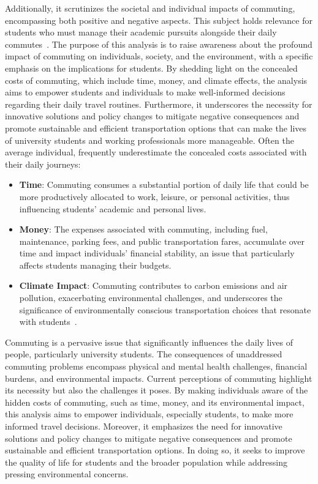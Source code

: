 Additionally, it scrutinizes the societal and individual impacts of commuting, encompassing both positive and negative
aspects.
This subject holds relevance for students who must manage their academic pursuits alongside their daily commutes~\cite{alma9921355859805762}.
The purpose of this analysis is to raise awareness about the profound impact of commuting on individuals, society, and
the environment, with a specific emphasis on the implications for students.
By shedding light on the concealed costs of commuting, which include time, money, and climate effects, the analysis aims
to empower students and individuals to make well-informed decisions regarding their daily travel routines.
Furthermore, it underscores the necessity for innovative solutions and policy changes to mitigate negative consequences
and promote sustainable and efficient transportation options that can make the lives of university students and working
professionals more manageable.
Often the average individual, frequently underestimate the concealed costs associated with their daily journeys:

\begin{itemize}
    \item \textbf{Time}: Commuting consumes a substantial portion of daily life that could be more productively
    allocated to work, leisure, or personal activities, thus influencing students' academic and personal lives.
    \item \textbf{Money}: The expenses associated with commuting, including fuel, maintenance, parking fees, and public
    transportation fares, accumulate over time and impact individuals' financial stability, an issue that particularly
    affects students managing their budgets.
    \item \textbf{Climate Impact}: Commuting contributes to carbon emissions and air pollution, exacerbating
    environmental challenges, and underscores the significance of environmentally conscious transportation choices that
    resonate with students~\cite{alma9921355859805762}.
\end{itemize}

Commuting is a pervasive issue that significantly influences the daily lives of people, particularly university
students.
The consequences of unaddressed commuting problems encompass physical and mental health challenges, financial burdens,
and environmental impacts.
Current perceptions of commuting highlight its necessity but also the challenges it poses.
By making individuals aware of the hidden costs of commuting, such as time, money, and its environmental impact, this
analysis aims to empower individuals, especially students, to make more informed travel decisions.
Moreover, it emphasizes the need for innovative solutions and policy changes to mitigate negative consequences and
promote sustainable and efficient transportation options.
In doing so, it seeks to improve the quality of life for students and the broader population while addressing pressing
environmental concerns.
